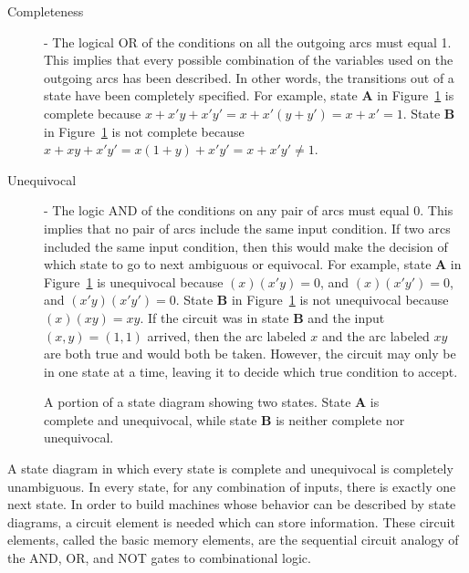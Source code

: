 \begin{description}
\label{page:completeness}
\item[Completeness] - The logical OR of the conditions on all the outgoing
arcs must equal 1.  This implies that every possible combination of the 
variables used on the outgoing arcs has been described.  In other words,
the transitions out of a state have been completely specified.  For 
example, state {\bf A} in Figure~\ref{fig:SDproperties} 
is complete because $x + x'y + x'y' = x + x'(y+y') = x + x' = 1$.  State 
{\bf B} in Figure~\ref{fig:SDproperties} is not complete because 
$x + xy + x'y' = x(1+y) + x'y' = x + x'y' \ne 1$.

\item[Unequivocal] - The logic AND of the conditions on any pair of arcs
must equal 0.  This implies that no pair of arcs include the same input
condition.  If two arcs included the same input condition, then
this would make the decision of which state to go to next ambiguous or
equivocal.  For example, state {\bf A} in Figure~\ref{fig:SDproperties}
is unequivocal because $(x)(x'y) = 0$, and $(x)(x'y')=0$, and
$(x'y)(x'y') = 0$.  State {\bf B} in Figure~\ref{fig:SDproperties} is not
unequivocal because $(x)(xy) = xy$.  If the circuit was in state {\bf B} and 
the input $(x,y)=(1,1)$ arrived, then the arc labeled $x$ and the arc
labeled $xy$ are both true and would both be taken.  However, the
circuit may only be in one state at a time, leaving it to decide which
true condition to accept.
\end{description}

\begin{figure}[ht]
\caption{A portion of a state diagram showing two states.
State {\bf A} is complete and unequivocal, while state {\bf B} is
neither complete nor unequivocal.}
\label{fig:SDproperties}
\end{figure}

A state diagram in which every state is complete and unequivocal 
is completely unambiguous.  In every state, for any combination of
inputs, there is exactly one next state.  In order to 
build machines whose behavior can be described by state diagrams,
a circuit element is needed which can store information.  These
circuit elements, called the basic memory elements, are the 
sequential circuit analogy of the AND, OR, and NOT gates to
combinational logic. 



